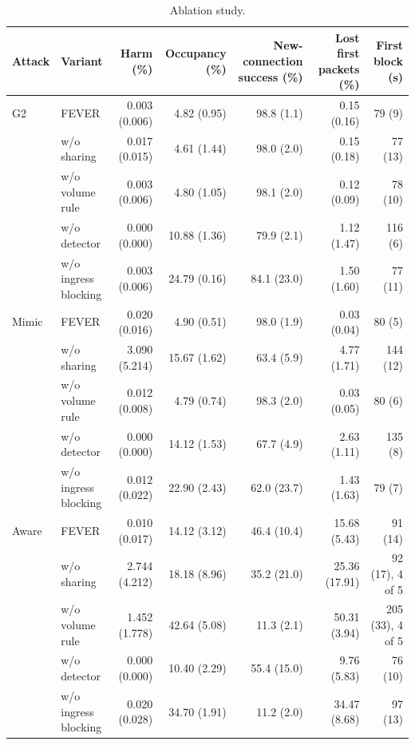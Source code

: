 \begin{table}[t]
\centering
\caption{Ablation study.}
\label{tab:ablation}
\small
\begin{tabular}{llrrrrr}
\toprule
Attack & Variant & Harm (\%) & Occupancy (\%) & New-connection success (\%) & Lost first packets (\%) & First block (s) \\
\midrule
G2 & FEVER & 0.003 (0.006) & 4.82 (0.95) & 98.8 (1.1) & 0.15 (0.16) & 79 (9) \\
 & w/o sharing & 0.017 (0.015) & 4.61 (1.44) & 98.0 (2.0) & 0.15 (0.18) & 77 (13) \\
 & w/o volume rule & 0.003 (0.006) & 4.80 (1.05) & 98.1 (2.0) & 0.12 (0.09) & 78 (10) \\
 & w/o detector & 0.000 (0.000) & 10.88 (1.36) & 79.9 (2.1) & 1.12 (1.47) & 116 (6) \\
 & w/o ingress blocking & 0.003 (0.006) & 24.79 (0.16) & 84.1 (23.0) & 1.50 (1.60) & 77 (11) \\
\midrule
Mimic & FEVER & 0.020 (0.016) & 4.90 (0.51) & 98.0 (1.9) & 0.03 (0.04) & 80 (5) \\
 & w/o sharing & 3.090 (5.214) & 15.67 (1.62) & 63.4 (5.9) & 4.77 (1.71) & 144 (12) \\
 & w/o volume rule & 0.012 (0.008) & 4.79 (0.74) & 98.3 (2.0) & 0.03 (0.05) & 80 (6) \\
 & w/o detector & 0.000 (0.000) & 14.12 (1.53) & 67.7 (4.9) & 2.63 (1.11) & 135 (8) \\
 & w/o ingress blocking & 0.012 (0.022) & 22.90 (2.43) & 62.0 (23.7) & 1.43 (1.63) & 79 (7) \\
\midrule
Aware & FEVER & 0.010 (0.017) & 14.12 (3.12) & 46.4 (10.4) & 15.68 (5.43) & 91 (14) \\
 & w/o sharing & 2.744 (4.212) & 18.18 (8.96) & 35.2 (21.0) & 25.36 (17.91) & 92 (17), 4 of 5 \\
 & w/o volume rule & 1.452 (1.778) & 42.64 (5.08) & 11.3 (2.1) & 50.31 (3.94) & 205 (33), 4 of 5 \\
 & w/o detector & 0.000 (0.000) & 10.40 (2.29) & 55.4 (15.0) & 9.76 (5.83) & 76 (10) \\
 & w/o ingress blocking & 0.020 (0.028) & 34.70 (1.91) & 11.2 (2.0) & 34.47 (8.68) & 97 (13) \\
\bottomrule
\end{tabular}
\end{table}
